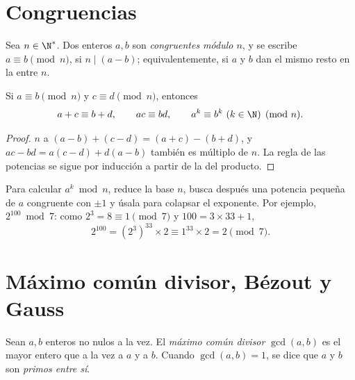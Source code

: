 \section{Congruencias}

\begin{definition}[Congruencia]\label{def:g12:arith:congruence}
Sea $n \in \N^*$. Dos enteros $a, b$ son \emph{congruentes módulo
$n$}, y se escribe $a \equiv b \pmod n$, si
$n \mid (a - b)$; equivalentemente, si $a$ y $b$ dan el mismo resto en la
 entre $n$.
\end{definition}

\begin{proposition}\label{prop:g12:arith:congops}
Si $a \equiv b \pmod n$ y $c \equiv d \pmod n$, entonces
\[
a + c \equiv b + d, \qquad
ac \equiv bd, \qquad
a^k \equiv b^k \ (k \in \N) \pmod n .
\]
\end{proposition}

\begin{proof}
$n$  a $(a-b) + (c-d) = (a+c) - (b+d)$, y
$ac - bd = a(c - d) + d(a - b)$ también es múltiplo de $n$. La regla de las
potencias se sigue por inducción a partir de la del producto.
\end{proof}

\begin{method}\label{met:g12:arith:powers}
Para calcular $a^k \bmod n$, reduce la base  $n$, busca después una
potencia pequeña de $a$ congruente con $\pm1$ y úsala para colapsar el
exponente. Por ejemplo, $2^{100} \bmod 7$: como $2^3 = 8 \equiv 1 \pmod 7$
y $100 = 3\times33 + 1$,
\[
2^{100} = \left(2^{3}\right)^{33} \times 2 \equiv 1^{33}\times 2 = 2 \pmod 7 .
\]
\end{method}

\section{Máximo común divisor, Bézout y Gauss}

\begin{definition}\label{def:g12:arith:gcd}
Sean $a, b$ enteros no nulos a la vez. El \emph{máximo común
divisor} $\gcd(a, b)$ es el mayor entero que
 a la vez a $a$ y a $b$. Cuando $\gcd(a,b) = 1$, se dice que $a$ y
$b$ son \emph{primos entre sí}.
\end{definition}

